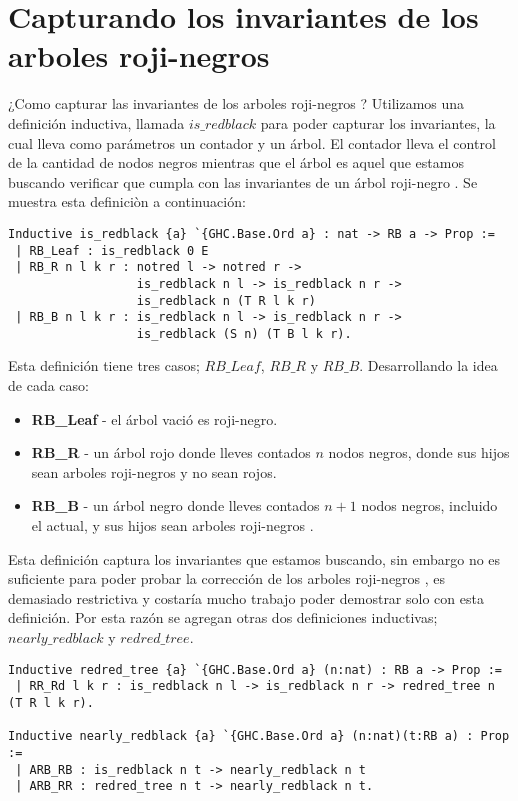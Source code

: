 \documentclass[letterpaper,12pt,oneside]{book}
\newcommand{\arn}{árbol roji-negro }
\newcommand{\arns}{arboles roji-negros }
\theoremstyle{plain}
\theoremstyle{definition}
\theoremstyle{remark}
\begin{document}
\section{Capturando los invariantes de los \arns}
¿Como capturar las invariantes de los \arns? Utilizamos una definición inductiva, llamada $is\_redblack$
para poder capturar los invariantes, la cual lleva como parámetros un contador y un \'arbol. El contador
lleva el control de la cantidad de nodos negros mientras que el \'arbol es aquel que estamos buscando
verificar que cumpla con las invariantes de un \arn. Se muestra esta definici\`on a continuaci\'on:

\begin{verbatim}
Inductive is_redblack {a} `{GHC.Base.Ord a} : nat -> RB a -> Prop :=
 | RB_Leaf : is_redblack 0 E
 | RB_R n l k r : notred l -> notred r ->
                  is_redblack n l -> is_redblack n r ->
                  is_redblack n (T R l k r)
 | RB_B n l k r : is_redblack n l -> is_redblack n r ->
                  is_redblack (S n) (T B l k r).
\end{verbatim}

Esta definici\'on tiene tres casos; $RB\_Leaf$, $RB\_R$ y $RB\_B$. Desarrollando la idea de cada caso:
\begin{itemize}
        \item \textbf{RB\_Leaf} - el árbol vació es roji-negro.
        \item \textbf{RB\_R} - un árbol rojo donde lleves contados $n$ nodos negros, donde sus hijos sean \arns y no sean rojos.
        \item \textbf{RB\_B} - un árbol negro donde lleves contados $n+1$ nodos negros, incluido el actual, y sus hijos sean \arns.
\end{itemize}

Esta definici\'on captura los invariantes que estamos buscando, sin embargo no es suficiente para poder probar la correcci\'on de los \arns,
es demasiado restrictiva y costaría mucho trabajo poder demostrar solo con esta definici\'on. Por esta razón se agregan otras dos definiciones inductivas;
$nearly\_redblack$ y $redred\_tree$. 

\begin{verbatim}
Inductive redred_tree {a} `{GHC.Base.Ord a} (n:nat) : RB a -> Prop :=
 | RR_Rd l k r : is_redblack n l -> is_redblack n r -> redred_tree n (T R l k r).

Inductive nearly_redblack {a} `{GHC.Base.Ord a} (n:nat)(t:RB a) : Prop :=
 | ARB_RB : is_redblack n t -> nearly_redblack n t
 | ARB_RR : redred_tree n t -> nearly_redblack n t.
\end{verbatim}
\end{document}
